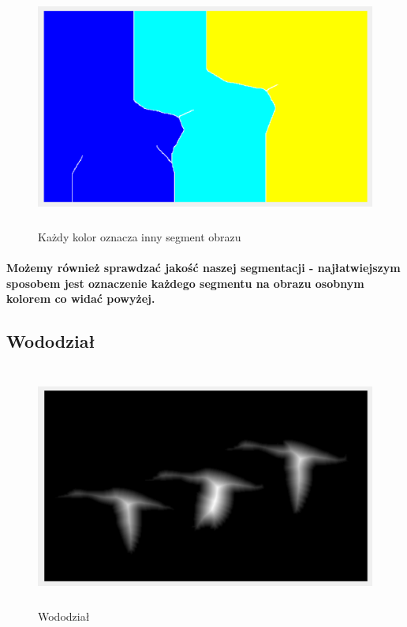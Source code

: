 \documentclass[a4paper,12pt]{article}
\begin{document}
\begin{justify}
\begin{figure}[h]
\centering
\includegraphics[width=12cm, height=8cm]{9}
\caption{Każdy kolor oznacza inny segment obrazu}
\end{figure}

\paragraph{Możemy również sprawdzać jakość naszej segmentacji - najłatwiejszym sposobem jest oznaczenie każdego segmentu na obrazu osobnym kolorem co widać powyżej.}

\newpage

\subsection{Wododział}

\begin{figure}[h]
\centering
\includegraphics[width=12cm, height=8cm]{10}
\caption{Wododział}
\end{figure}


\end{justify}
\end{document}
